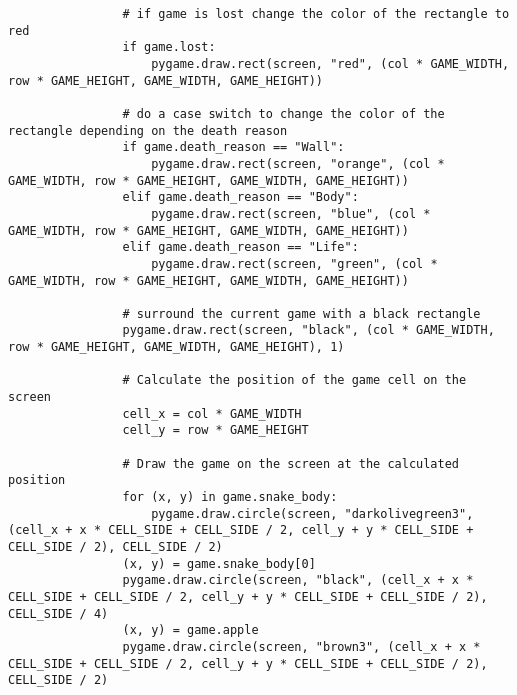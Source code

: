 \documentclass[11pt,a4paper]{article}
\begin{document}
\begin{verbatim}
                # if game is lost change the color of the rectangle to red
                if game.lost:
                    pygame.draw.rect(screen, "red", (col * GAME_WIDTH, row * GAME_HEIGHT, GAME_WIDTH, GAME_HEIGHT))

                # do a case switch to change the color of the rectangle depending on the death reason
                if game.death_reason == "Wall":
                    pygame.draw.rect(screen, "orange", (col * GAME_WIDTH, row * GAME_HEIGHT, GAME_WIDTH, GAME_HEIGHT))
                elif game.death_reason == "Body":
                    pygame.draw.rect(screen, "blue", (col * GAME_WIDTH, row * GAME_HEIGHT, GAME_WIDTH, GAME_HEIGHT))
                elif game.death_reason == "Life":
                    pygame.draw.rect(screen, "green", (col * GAME_WIDTH, row * GAME_HEIGHT, GAME_WIDTH, GAME_HEIGHT))

                # surround the current game with a black rectangle
                pygame.draw.rect(screen, "black", (col * GAME_WIDTH, row * GAME_HEIGHT, GAME_WIDTH, GAME_HEIGHT), 1)

                # Calculate the position of the game cell on the screen
                cell_x = col * GAME_WIDTH
                cell_y = row * GAME_HEIGHT

                # Draw the game on the screen at the calculated position
                for (x, y) in game.snake_body:
                    pygame.draw.circle(screen, "darkolivegreen3", (cell_x + x * CELL_SIDE + CELL_SIDE / 2, cell_y + y * CELL_SIDE + CELL_SIDE / 2), CELL_SIDE / 2)
                (x, y) = game.snake_body[0]
                pygame.draw.circle(screen, "black", (cell_x + x * CELL_SIDE + CELL_SIDE / 2, cell_y + y * CELL_SIDE + CELL_SIDE / 2), CELL_SIDE / 4)
                (x, y) = game.apple
                pygame.draw.circle(screen, "brown3", (cell_x + x * CELL_SIDE + CELL_SIDE / 2, cell_y + y * CELL_SIDE + CELL_SIDE / 2), CELL_SIDE / 2)


\end{verbatim}
\end{document}
